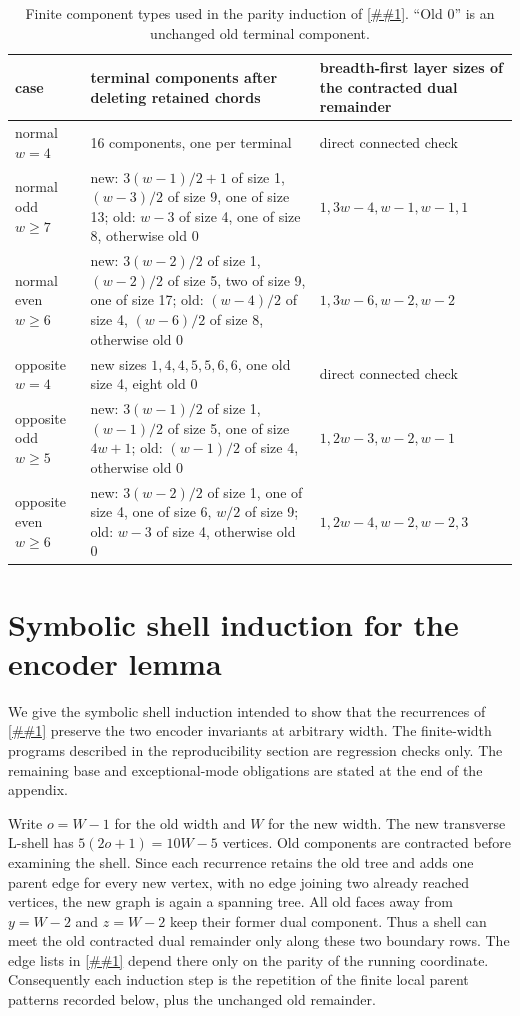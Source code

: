 \documentclass[11pt]{article}
\newcommand{\cref}[1]{\autoref{##1}}%
\begin{document}
\begin{table}[p]
\centering
\caption{Finite component types used in the parity induction of
\cref{lem:encoders}.  ``Old 0'' is an unchanged old terminal component.}
\label{tab:encoder-checks}
\scriptsize
\begin{tabular}{@{}p{}p{}p{}@{}}
\toprule
case & terminal components after deleting retained chords
& breadth-first layer sizes of the contracted dual remainder\\
\midrule
normal \(w=4\) & 16 components, one per terminal & direct connected check\\
normal odd \(w\geq7\) & new: \(3(w-1)/2+1\) of size 1,
\((w-3)/2\) of size 9, one of size 13; old: \(w-3\) of size 4, one of
size 8, otherwise old 0 & \(1,3w-4,w-1,w-1,1\)\\
normal even \(w\geq6\) & new: \(3(w-2)/2\) of size 1,
\((w-2)/2\) of size 5, two of size 9, one of size 17; old:
\((w-4)/2\) of size 4, \((w-6)/2\) of size 8, otherwise old 0
& \(1,3w-6,w-2,w-2\)\\
opposite \(w=4\) & new sizes \(1,4,4,5,5,6,6\), one old size 4,
eight old 0 & direct connected check\\
opposite odd \(w\geq5\) & new: \(3(w-1)/2\) of size 1,
\((w-1)/2\) of size 5, one of size \(4w+1\); old: \((w-1)/2\) of size 4,
otherwise old 0 & \(1,2w-3,w-2,w-1\)\\
opposite even \(w\geq6\) & new: \(3(w-2)/2\) of size 1, one of size 4,
one of size 6, \(w/2\) of size 9; old: \(w-3\) of size 4, otherwise old 0
& \(1,2w-4,w-2,w-2,3\)\\
\bottomrule
\end{tabular}
\end{table}

\clearpage
\section{Symbolic shell induction for the encoder lemma}
\label{app:encoder-induction}

We give the symbolic shell induction intended to show that the recurrences
of \cref{app:encoders} preserve the two encoder invariants at arbitrary
width.  The finite-width programs described in the reproducibility section
are regression checks only.  The remaining base and exceptional-mode
obligations are stated at the end of the appendix.

Write \(o=W-1\) for the old width and \(W\) for the new width.  The new transverse
L-shell has \(5(2o+1)=10W-5\) vertices.  Old components are contracted
before examining the shell.  Since each recurrence retains the old tree and
adds one parent edge for every new vertex, with no edge joining two already
reached vertices, the new graph is again a spanning tree.  All old faces
away from \(y=W-2\) and \(z=W-2\) keep their former dual component.  Thus a
shell can meet the old contracted dual remainder only along these two
boundary rows.  The edge lists in \cref{app:encoders} depend there only on
the parity of the running coordinate.  Consequently each induction step is
the repetition of the finite local parent patterns recorded below, plus the
unchanged old remainder.
\end{document}
